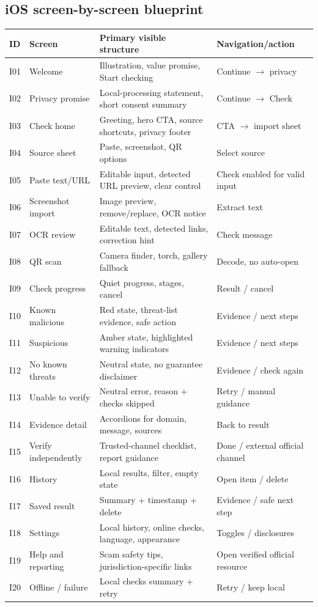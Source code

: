 \documentclass[10pt,a4paper]{article}
\begin{document}
\subsection{iOS screen-by-screen blueprint}
\small
\begin{longtable}{@{}p{10mm}p{40mm}p{62mm}p{46mm}@{}}\toprule
\textbf{ID} & \textbf{Screen} & \textbf{Primary visible structure} & \textbf{Navigation/action} \\ \midrule\endhead
I01 & Welcome & Illustration, value promise, Start checking & Continue $\rightarrow$ privacy \\ \midrule
I02 & Privacy promise & Local-processing statement, short consent summary & Continue $\rightarrow$ Check \\ \midrule
I03 & Check home & Greeting, hero CTA, source shortcuts, privacy footer & CTA $\rightarrow$ import sheet \\ \midrule
I04 & Source sheet & Paste, screenshot, QR options & Select source \\ \midrule
I05 & Paste text/URL & Editable input, detected URL preview, clear control & Check enabled for valid input \\ \midrule
I06 & Screenshot import & Image preview, remove/replace, OCR notice & Extract text \\ \midrule
I07 & OCR review & Editable text, detected links, correction hint & Check message \\ \midrule
I08 & QR scan & Camera finder, torch, gallery fallback & Decode, no auto-open \\ \midrule
I09 & Check progress & Quiet progress, stages, cancel & Result / cancel \\ \midrule
I10 & Known malicious & Red state, threat-list evidence, safe action & Evidence / next steps \\ \midrule
I11 & Suspicious & Amber state, highlighted warning indicators & Evidence / next steps \\ \midrule
I12 & No known threats & Neutral state, no guarantee disclaimer & Evidence / check again \\ \midrule
I13 & Unable to verify & Neutral error, reason + checks skipped & Retry / manual guidance \\ \midrule
I14 & Evidence detail & Accordions for domain, message, sources & Back to result \\ \midrule
I15 & Verify independently & Trusted-channel checklist, report guidance & Done / external official channel \\ \midrule
I16 & History & Local results, filter, empty state & Open item / delete \\ \midrule
I17 & Saved result & Summary + timestamp + delete & Evidence / safe next step \\ \midrule
I18 & Settings & Local history, online checks, language, appearance & Toggles / disclosures \\ \midrule
I19 & Help and reporting & Scam safety tips, jurisdiction-specific links & Open verified official resource \\ \midrule
I20 & Offline / failure & Local checks summary + retry & Retry / keep local \\ \bottomrule
\end{longtable}
\normalsize
\end{document}
